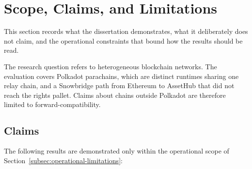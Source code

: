 \section{Scope, Claims, and Limitations}\label{sec:scope-and-limitations}

This section records what the dissertation demonstrates, what it deliberately does not claim, and the operational constraints that bound how the results should be read.

The research question refers to heterogeneous blockchain networks. The evaluation covers Polkadot parachains, which are distinct runtimes sharing one relay chain, and a Snowbridge path from Ethereum to AssetHub that did not reach the rights pallet. Claims about chains outside Polkadot are therefore limited to forward-compatibility.

\subsection{Claims}\label{subsec:claims}

The following results are demonstrated only within the operational scope of Section~\ref{subsec:operational-limitations}:

